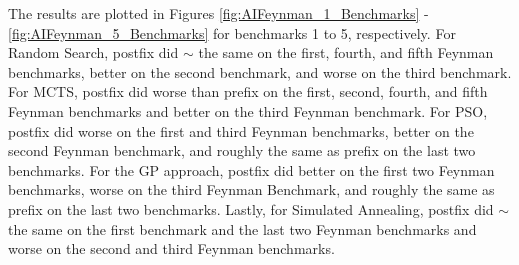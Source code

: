 \documentclass[12pt]{iopart}
\begin{document}
\begin{table}[]
    \centering
    \caption{Expressions from \cite{udrescu2020ai} considered in section \ref{subsec:FeynmanBenchmarks}.}
    \label{tab:AI_Feynman_Benchmark_Equations}
\end{table}

\par The results are plotted in Figures \ref{fig:AIFeynman_1_Benchmarks} - \ref{fig:AIFeynman_5_Benchmarks} for benchmarks 1 to 5, respectively. For Random Search, postfix did $\sim$ the same on the first, fourth, and fifth Feynman benchmarks, better on the second benchmark, and worse on the third benchmark. For MCTS, postfix did worse than prefix on the first, second, fourth, and fifth Feynman benchmarks and better on the third Feynman benchmark. For PSO, postfix did worse on the first and third Feynman benchmarks, better on the second Feynman benchmark, and roughly the same as prefix on the last two benchmarks. For the GP approach, postfix did better on the first two Feynman benchmarks, worse on the third Feynman Benchmark, and roughly the same as prefix on the last two benchmarks. Lastly, for Simulated Annealing, postfix did $\sim$ the same on the first benchmark and the last two Feynman benchmarks and worse on the second and third Feynman benchmarks.
\end{document}
